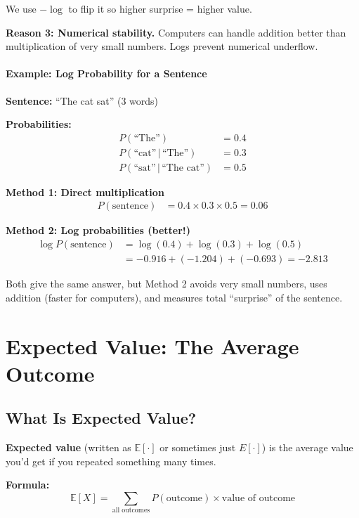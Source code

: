 \begin{chapterenv}
We use $-\log$ to flip it so higher surprise = higher value.

\textbf{Reason 3: Numerical stability.} Computers can handle addition better than multiplication of very small numbers. Logs prevent numerical underflow.

\paragraph{Example: Log Probability for a Sentence}

\textbf{Sentence:} ``The cat sat'' (3 words)

\textbf{Probabilities:}
\begin{align*}
P(\text{``The''}) &= 0.4 \\
P(\text{``cat''} \,|\, \text{``The''}) &= 0.3 \\
P(\text{``sat''} \,|\, \text{``The cat''}) &= 0.5
\end{align*}

\textbf{Method 1: Direct multiplication}
\begin{align*}
P(\text{sentence}) &= 0.4 \times 0.3 \times 0.5 = 0.06
\end{align*}

\textbf{Method 2: Log probabilities (better!)}
\begin{align*}
\log P(\text{sentence}) &= \log(0.4) + \log(0.3) + \log(0.5) \\
&= -0.916 + (-1.204) + (-0.693) = -2.813
\end{align*}

Both give the same answer, but Method 2 avoids very small numbers, uses addition (faster for computers), and measures total ``surprise'' of the sentence.

\section{Expected Value: The Average Outcome}

\subsection{What Is Expected Value?}

\textbf{Expected value} (written as $\mathbb{E}[\cdot]$ or sometimes just $E[\cdot]$) is the average value you'd get if you repeated something many times.

\textbf{Formula:}
\[\mathbb{E}[X] = \sum_{\text{all outcomes}} P(\text{outcome}) \times \text{value of outcome}\]


\end{chapterenv}
